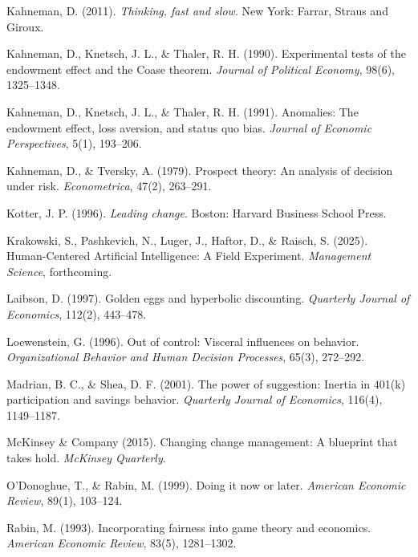 \documentclass[11pt,a4paper]{article}
\begin{document}
\vspace{0.3cm}
Kahneman, D. (2011). \textit{Thinking, fast and slow}. New York: Farrar, Straus and Giroux.

\vspace{0.3cm}
Kahneman, D., Knetsch, J. L., \& Thaler, R. H. (1990). Experimental tests of the endowment effect and the Coase theorem. \textit{Journal of Political Economy}, 98(6), 1325--1348.

\vspace{0.3cm}
Kahneman, D., Knetsch, J. L., \& Thaler, R. H. (1991). Anomalies: The endowment effect, loss aversion, and status quo bias. \textit{Journal of Economic Perspectives}, 5(1), 193--206.

\vspace{0.3cm}
Kahneman, D., \& Tversky, A. (1979). Prospect theory: An analysis of decision under risk. \textit{Econometrica}, 47(2), 263--291.

\vspace{0.3cm}
Kotter, J. P. (1996). \textit{Leading change}. Boston: Harvard Business School Press.

\vspace{0.3cm}
Krakowski, S., Pashkevich, N., Luger, J., Haftor, D., \& Raisch, S. (2025). Human-Centered Artificial Intelligence: A Field Experiment. \textit{Management Science}, forthcoming.

\vspace{0.3cm}
Laibson, D. (1997). Golden eggs and hyperbolic discounting. \textit{Quarterly Journal of Economics}, 112(2), 443--478.

\vspace{0.3cm}
Loewenstein, G. (1996). Out of control: Visceral influences on behavior. \textit{Organizational Behavior and Human Decision Processes}, 65(3), 272--292.

\vspace{0.3cm}
Madrian, B. C., \& Shea, D. F. (2001). The power of suggestion: Inertia in 401(k) participation and savings behavior. \textit{Quarterly Journal of Economics}, 116(4), 1149--1187.

\vspace{0.3cm}
McKinsey \& Company (2015). Changing change management: A blueprint that takes hold. \textit{McKinsey Quarterly}.

\vspace{0.3cm}
O'Donoghue, T., \& Rabin, M. (1999). Doing it now or later. \textit{American Economic Review}, 89(1), 103--124.

\vspace{0.3cm}
Rabin, M. (1993). Incorporating fairness into game theory and economics. \textit{American Economic Review}, 83(5), 1281--1302.
\end{document}
